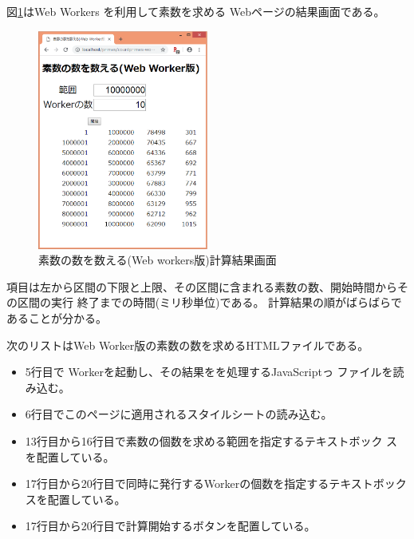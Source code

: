    \begin{Exec}\upshape
    図\ref{countPrimes-workers-res}はWeb Workers を利用して素数を求める
    Webページの結果画面である。
    \begin{figure}[ht]
	\begin{center}
	 \includegraphics[width=0.5\textwidth]{primes/countPrimes-workers-res.eps}
	\end{center}
 \caption{素数の数を数える(Web workers版)計算結果画面}\label{countPrimes-workers-res}
 \end{figure}
 項目は左から区間の下限と上限、その区間に含まれる素数の数、開始時間からその区間の実行
 終了までの時間(ミリ秒単位)である。
%
    計算結果の順がばらばらであることが分かる。
    
 次のリストはWeb Worker版の素数の数を求めるHTMLファイルである。
 \begin{itemize}
  \item 5行目で Workerを起動し、その結果をを処理するJavaScriptっ
        ファイルを読み込む。
  \item 6行目でこのページに適用されるスタイルシートの読み込む。
  \item 13行目から16行目で素数の個数を求める範囲を指定するテキストボック
        スを配置している。
   \item 17行目から20行目で同時に発行するWorkerの個数を指定するテキストボック
        スを配置している。
  \item 17行目から20行目で計算開始するボタンを配置している。
 \end{itemize}


\end{Exec}
